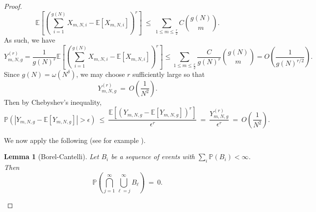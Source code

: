 \documentclass[11pt,reqno]{amsart}
\numberwithin{equation}{section}
\newtheorem{lem}[thm]{Lemma}
\theoremstyle{plain}
\newcommand{\E}[1]{\mathbb{E}[#1]}
\begin{document}
\begin{proof}
\begin{equation}
\mathbb{E}\left[\left(\sum_{i=1}^{g(N)} X_{m,N,i}-\E{X_{m,N,i}}\right)^r\right]\ \leq\ \sum_{1\leq m \leq \frac{r}{2}}  C\binom{g(N)}{m}.
\end{equation}
As such, we have
\begin{equation}
Y_{m,N,g}^{(r)} = \frac{1}{g(N)^r} \mathbb{E}\left[\left(\sum_{i=1}^{g(N)} X_{m,N,i}-\E{X_{m,N,i}}\right)^r\right] \leq \sum_{1\leq m \leq \frac{r}{2}} \frac{C}{g(N)^r}\binom{g(N)}{m}  = O\left(\frac{1}{g(N)^{r/2}}\right).
\end{equation}
Since $g(N) = \omega(N^\delta)$, we may choose $r$ sufficiently large so that
\begin{equation}
Y_{m,N,g}^{(r)}\ =\ O\left(\frac{1}{N^2}\right).
\end{equation}
Then by Chebyshev's inequality,
\begin{equation}
\mathbb{P}(|Y_{m,N,g}-\E{Y_{m,N,g}}|>\epsilon)\ \leq\ \frac{\E{(Y_{m,N,g}-\E{Y_{m,N,g}})^r}}{\epsilon^r}\ =\ \frac{Y_{m,N,g}^{(r)}}{\epsilon^r}\ =\ O\left(\frac{1}{N^2}\right).
\end{equation}

We now apply the following (see for example \cite{Can}).

\begin{lem}[Borel-Cantelli]
Let $B_i$ be a sequence of events with $\sum_i \mathbb{P}(B_i)<\infty$. Then
\begin{equation}
\mathbb{P}\left(\bigcap_{j=1}^\infty \bigcup_{\ell=j}^\infty B_\ell\right)\ =\ 0.
\end{equation}
\end{lem}


\end{proof}
\end{document}
